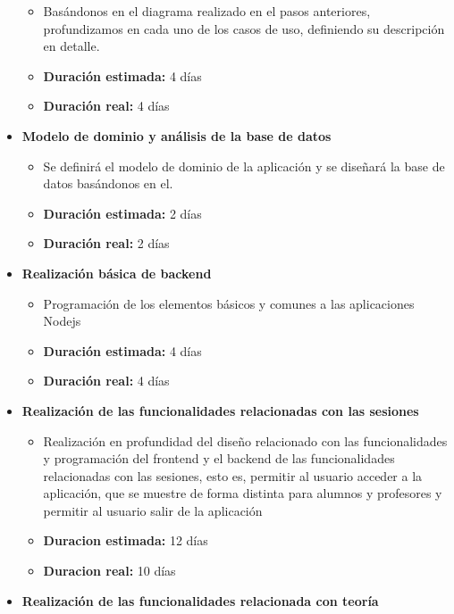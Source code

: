 \documentclass[openright,twoside,10pt]{book}
\providecommand{\tightlist}{%
  \setlength{\itemsep}{0pt}\setlength{\parskip}{0pt}}
\begin{document}
\begin{itemize}
      \begin{itemize}
      \tightlist
      \item
        Basándonos en el diagrama realizado en el pasos anteriores,
        profundizamos en cada uno de los casos de uso, definiendo su
        descripción en detalle.
      \item
        \textbf{Duración estimada:} 4 días
      \item
        \textbf{Duración real:} 4 días
      \end{itemize}
    \item
      \textbf{Modelo de dominio y análisis de la base de datos}
    
      \begin{itemize}
      \tightlist
      \item
        Se definirá el modelo de dominio de la aplicación y se diseñará la
        base de datos basándonos en el.
      \item
        \textbf{Duración estimada:} 2 días
      \item
        \textbf{Duración real:} 2 días
      \end{itemize}
    \item
      \textbf{Realización básica de backend}
    
      \begin{itemize}
      \tightlist
      \item
        Programación de los elementos básicos y comunes a las aplicaciones
        Nodejs
      \item
        \textbf{Duración estimada:} 4 días
      \item
        \textbf{Duración real:} 4 días
      \end{itemize}
    \item
      \textbf{Realización de las funcionalidades relacionadas con las
      sesiones}
    
      \begin{itemize}
      \tightlist
      \item
        Realización en profundidad del diseño relacionado con las
        funcionalidades y programación del frontend y el backend de las
        funcionalidades relacionadas con las sesiones, esto es, permitir al
        usuario acceder a la aplicación, que se muestre de forma distinta
        para alumnos y profesores y permitir al usuario salir de la
        aplicación
      \item
        \textbf{Duracion estimada:} 12 días
      \item
        \textbf{Duracion real:} 10 días
      \end{itemize}
    \item
      \textbf{Realización de las funcionalidades relacionada con teoría}
    

\end{itemize}
\end{document}
